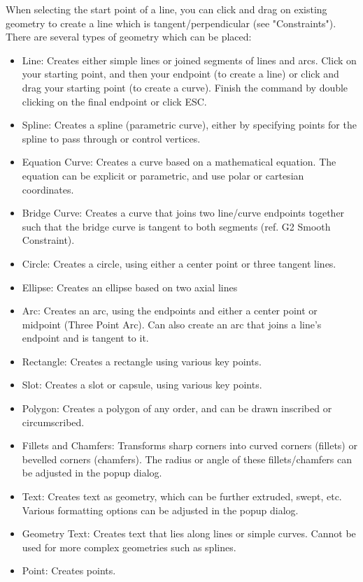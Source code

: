 When selecting the start point of a line, you can click and drag on existing geometry to create a line which is tangent/perpendicular (see "Constraints"). There are several types of geometry which can be placed:

\begin{itemize}
\item Line: Creates either simple lines or joined segments of lines and arcs. Click on your starting point, and then your endpoint (to create a line) or click and drag your starting point (to create a curve). Finish the command by double clicking on the final endpoint or click ESC.
\item Spline: Creates a spline (parametric curve), either by specifying points for the spline to pass through or control vertices. 
\item Equation Curve: Creates a curve based on a mathematical equation. The equation can be explicit or parametric, and use polar or cartesian coordinates.
\item Bridge Curve: Creates a curve that joins two line/curve endpoints together such that the bridge curve is tangent to both segments (ref. G2 Smooth Constraint).
\item Circle: Creates a circle, using either a center point or three tangent lines.
\item Ellipse: Creates an ellipse based on two axial lines
\item Arc: Creates an arc, using the endpoints and either a center point or midpoint (Three Point Arc). Can also create an arc that joins a line's endpoint and is tangent to it.
\item Rectangle: Creates a rectangle using various key points.
\item Slot: Creates a slot or capsule, using various key points.
\item Polygon: Creates a polygon of any order, and can be drawn inscribed or circumscribed.
\item Fillets and Chamfers: Transforms sharp corners into curved corners (fillets) or bevelled corners (chamfers). The radius or angle of these fillets/chamfers can be adjusted in the popup dialog.
\item Text: Creates text as geometry, which can be further extruded, swept, etc. Various formatting options can be adjusted in the popup dialog.
\item Geometry Text: Creates text that lies along lines or simple curves. Cannot be used for more complex geometries such as splines.
\item Point: Creates points.

\end{itemize}

